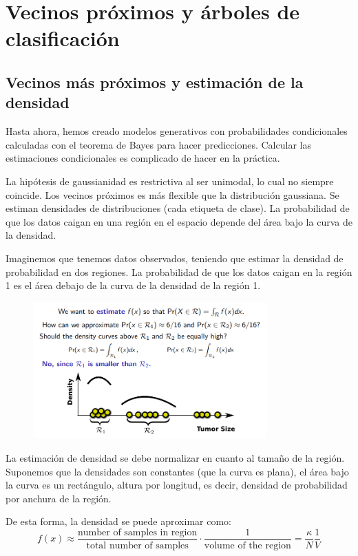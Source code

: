 \section{Vecinos próximos y árboles de clasificación}
\subsection{Vecinos más próximos y estimación de la densidad}
Hasta ahora, hemos creado modelos generativos con probabilidades condicionales calculadas con el teorema de Bayes para hacer predicciones. Calcular las estimaciones condicionales es complicado de hacer en la práctica. 

La hipótesis de gaussianidad es restrictiva al ser unimodal, lo cual no siempre coincide. Los vecinos próximos es más flexible que la distribución gaussiana. Se estiman densidades de distribuciones (cada etiqueta de clase). La probabilidad de que los datos caigan en una región en el espacio depende del área bajo la curva de la densidad. 

Imaginemos que tenemos datos observados, teniendo que estimar la densidad de probabilidad en dos regiones. La probabilidad de que los datos caigan en la región 1 es el área debajo de la curva de la densidad de la región 1. 

\begin{figure}[h]
\centering
\includegraphics[width = 0.8\textwidth]{figs/density-estimation.png}
\end{figure}

La estimación de densidad se debe normalizar en cuanto al tamaño de la región. Suponemos que la densidades son constantes (que la curva es plana), el área bajo la curva es un rectángulo, altura por longitud, es decir, densidad de probabilidad por anchura de la región.

De esta forma, la densidad se puede aproximar como:
$$f(x) \approx \frac{\text{number of samples in region}}{\text{total number of samples}} \cdot \frac{1}{\text{volume of the region}} = \frac{\kappa}{N} \frac{1}{V}$$

